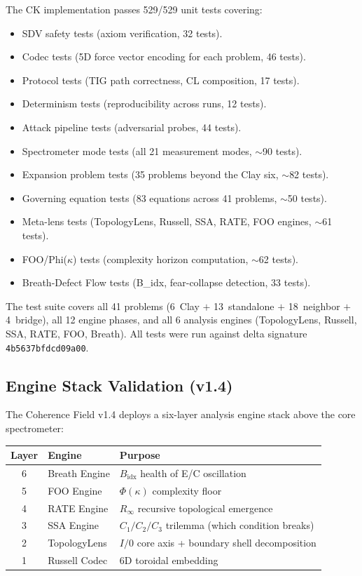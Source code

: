 \documentclass[11pt]{article}
\begin{document}
The CK implementation passes 529/529 unit tests covering:
\begin{itemize}
\item SDV safety tests (axiom verification, 32 tests).
\item Codec tests (5D force vector encoding for each problem, 46 tests).
\item Protocol tests (TIG path correctness, CL composition, 17 tests).
\item Determinism tests (reproducibility across runs, 12 tests).
\item Attack pipeline tests (adversarial probes, 44 tests).
\item Spectrometer mode tests (all 21 measurement modes, $\sim$90 tests).
\item Expansion problem tests (35 problems beyond the Clay six, $\sim$82 tests).
\item Governing equation tests (83 equations across 41 problems, $\sim$50 tests).
\item Meta-lens tests (TopologyLens, Russell, SSA, RATE, FOO engines, $\sim$61 tests).
\item FOO/Phi($\kappa$) tests (complexity horizon computation, $\sim$62 tests).
\item Breath-Defect Flow tests (B\_idx, fear-collapse detection, 33 tests).
\end{itemize}

\noindent
The test suite covers all 41 problems (6~Clay $+$ 13~standalone $+$ 18~neighbor $+$ 4~bridge),
all 12 engine phases, and all 6 analysis engines (TopologyLens, Russell, SSA, RATE, FOO, Breath).
All tests were run against delta signature \texttt{4b5637bfdcd09a00}.

\subsection{Engine Stack Validation (v1.4)}
\label{subsec:engine-stack}

The Coherence Field v1.4 deploys a six-layer analysis engine stack
above the core spectrometer:

\begin{center}
\begin{tabular}{@{}clp{6.5cm}@{}}
\toprule
Layer & Engine & Purpose \\
\midrule
6 & Breath Engine & $B_{\mathrm{idx}}$ health of E/C oscillation \\
5 & FOO Engine & $\Phi(\kappa)$ complexity floor \\
4 & RATE Engine & $R_\infty$ recursive topological emergence \\
3 & SSA Engine & $C_1/C_2/C_3$ trilemma (which condition breaks) \\
2 & TopologyLens & $I/0$ core axis + boundary shell decomposition \\
1 & Russell Codec & 6D toroidal embedding \\
\bottomrule
\end{tabular}
\end{center}
\end{document}
